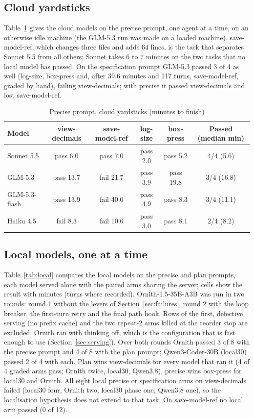 \subsection{Cloud yardsticks}

Table~\ref{tab:cloud} gives the cloud models on the precise prompt, one agent at a time, on an otherwise idle machine
(the GLM-5.3 run was made on a loaded machine). save-model-ref, which changes three files and adds 64 lines, is the
task that separates Sonnet 5.5 from all others; Sonnet takes 6 to 7 minutes on the two tasks that no local model has
passed. On the specification prompt GLM-5.3 passed 3 of 4 as well (log-size, box-press and, after 39.6 minutes and 117
turns, save-model-ref, graded by hand), failing view-decimals; with precise it passed view-decimals and lost
save-model-ref.

\begin{table}[htbp]
\centering
\small
\caption{Precise prompt, cloud yardsticks (minutes to finish)}\label{tab:cloud}
\begin{tabular}{lccccc}
\toprule
Model & view-decimals & save-model-ref & log-size & box-press & Passed (median min) \\
\midrule
Sonnet 5.5 & pass 6.0 & pass 7.0 & pass 2.0 & pass 5.2 & 4/4 (5.6) \\
GLM-5.3 & pass 13.7 & fail 21.7 & pass 3.9 & pass 19.8 & 3/4 (16.8) \\
GLM-5.3-flash & pass 13.9 & fail 40.0 & pass 4.9 & pass 8.3 & 3/4 (11.1) \\
Haiku 4.5 & fail 8.3 & fail 10.6 & pass 3.0 & pass 8.1 & 2/4 (8.2) \\
\bottomrule
\end{tabular}
\end{table}

\subsection{Local models, one at a time}

Table~\ref{tab:local} compares the local models on the precise and plan prompts, each model served alone with the
paired arms sharing the server; cells show the result with minutes (turns where recorded). Ornith-1.5-35B-A3B was run
in two rounds: round 1 without the levers of Section~\ref{sec:failures}, round 2 with the loop breaker, the
first-turn retry and the final path hook. Rows of the first, defective serving (no prefix cache) and the two repeat-2 arms
killed at the reorder stop are excluded. Ornith ran with thinking off, which is the configuration that is fast enough to
use (Section~\ref{sec:serving}). Over both rounds Ornith passed 3 of 8 with the precise prompt and 4 of 8 with the plan
prompt; Qwen3-Coder-30B (local30) passed 2 of 4 with each. Plan wins view-decimals for every model that ran it (4 of 4
graded arms pass; Ornith twice, local30, Qwen3.8), precise wins box-press for local30 and Ornith. All eight local
precise or specification arms on view-decimals failed (local30 four, Ornith two, local30 phase one, Qwen3.8 one), so
the localisation hypothesis does not extend to that task. On save-model-ref no local arm passed (0 of 12).

